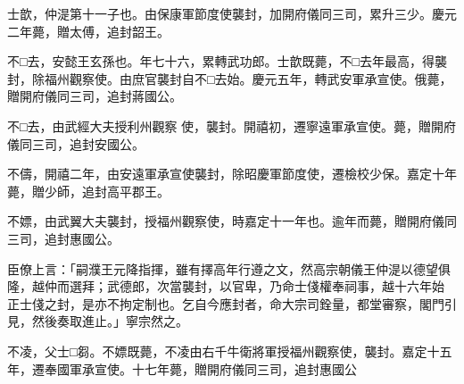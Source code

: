 \begin{pinyinscope}
 士歆，仲湜第十一子也。由保康軍節度使襲封，加開府儀同三司，累升三少。慶元二年薨，贈太傅，追封韶王。



 不□去，安懿王玄孫也。年七十六，累轉武功郎。士歆既薨，不□去年最高，得襲封，除福州觀察使。由庶官襲封自不□去始。慶元五年，轉武安軍承宣使。俄薨，贈開府儀同三司，追封蔣國公。



 不□去，由武經大夫授利州觀察
 使，襲封。開禧初，遷寧遠軍承宣使。薨，贈開府儀同三司，追封安國公。



 不儔，開禧二年，由安遠軍承宣使襲封，除昭慶軍節度使，遷檢校少保。嘉定十年薨，贈少師，追封高平郡王。



 不嫖，由武翼大夫襲封，授福州觀察使，時嘉定十一年也。逾年而薨，贈開府儀同三司，追封惠國公。



 臣僚上言：「嗣濮王元降指揮，雖有擇高年行遵之文，然高宗朝儀王仲湜以德望俱隆，越仲而選拜；武德郎，次當襲封，以官卑，乃命士俴權奉祠事，越十六年始
 正士俴之封，是亦不拘定制也。乞自今應封者，命大宗司銓量，都堂審察，閣門引見，然後奏取進止。」寧宗然之。



 不凌，父士□芻。不嫖既薨，不凌由右千牛衛將軍授福州觀察使，襲封。嘉定十五年，遷奉國軍承宣使。十七年薨，贈開府儀同三司，追封惠國公



\end{pinyinscope}